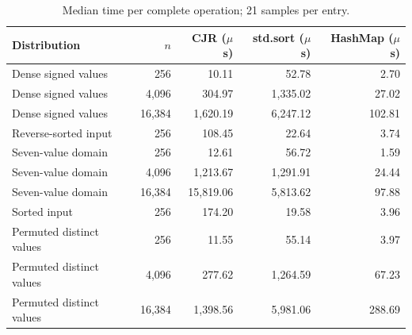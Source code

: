 \begin{table}[H]
\centering\small
\begin{tabular}{lrrrr}
\hline
Distribution & $n$ & CJR ($\mu$s) & std.sort ($\mu$s) & HashMap ($\mu$s) \\
\hline
Dense signed values & 256 & 10.11 & 52.78 & 2.70 \\
Dense signed values & 4,096 & 304.97 & 1,335.02 & 27.02 \\
Dense signed values & 16,384 & 1,620.19 & 6,247.12 & 102.81 \\
Reverse-sorted input & 256 & 108.45 & 22.64 & 3.74 \\
Seven-value domain & 256 & 12.61 & 56.72 & 1.59 \\
Seven-value domain & 4,096 & 1,213.67 & 1,291.91 & 24.44 \\
Seven-value domain & 16,384 & 15,819.06 & 5,813.62 & 97.88 \\
Sorted input & 256 & 174.20 & 19.58 & 3.96 \\
Permuted distinct values & 256 & 11.55 & 55.14 & 3.97 \\
Permuted distinct values & 4,096 & 277.62 & 1,264.59 & 67.23 \\
Permuted distinct values & 16,384 & 1,398.56 & 5,981.06 & 288.69 \\
\hline
\end{tabular}
\caption{Median time per complete operation; 21 samples per entry.}
\end{table}
